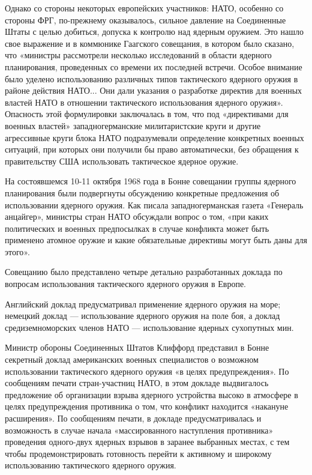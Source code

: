 \documentclass[12pt, a4paper, openany]{book}
\begin{document}
	Однако со стороны некоторых европейских участников: НАТО, особенно со стороны ФРГ, по-прежнему оказывалось, сильное давление на Соединенные Штаты с целью добиться, допуска к контролю над ядерным оружием. Это нашло свое выражение и в коммюнике Гаагского совещания, в котором было сказано, что «министры рассмотрели несколько исследований в области ядерного планирования, проведенных со времени их последней встречи. Особое внимание было уделено использованию различных типов тактического ядерного оружия в районе действия НАТО... Они дали указания о разработке директив для военных властей НАТО в отношении тактического использования ядерного оружия». Опасность этой формулировки заключалась в том, что под «директивами для военных властей» западногерманские милитаристские круги и другие агрессивные круги блока НАТО подразумевали определение конкретных военных ситуаций, при которых они получили бы право автоматически, без обращения к правительству США использовать тактическое ядерное оружие.
	
	На состоявшемся 10-11 октября 1968 года в Бонне совещании группы ядерного планирования были подвергнуты обсуждению конкретные предложения об использовании ядерного оружия. Как писала западногерманская газета «Генераль анцайгер», министры стран НАТО обсуждали вопрос о том, «при каких политических и военных предпосылках в случае конфликта может быть применено атомное оружие и какие обязательные директивы могут быть даны для этого».
	
	Совещанию было представлено четыре детально разработанных доклада по вопросам использования тактического ядерного оружия в Европе.
	
	Английский доклад предусматривал применение ядерного оружия на море; немецкий доклад — использование ядерного оружия на поле боя, а доклад средиземноморских членов НАТО — использование ядерных сухопутных мин.
	
	Министр обороны Соединенных Штатов Клиффорд представил в Бонне секретный доклад американских военных специалистов о возможном использовании тактического ядерного оружия «в целях предупреждения». По сообщениям печати стран-участниц НАТО, в этом докладе выдвигалось предложение об организации взрыва ядерного устройства высоко в атмосфере в целях предупреждения противника о том, что конфликт находится «накануне расширения». По сообщениям печати, в докладе предусматривалась и возможность в случае начала «массированного наступления противника» проведения одного-двух ядерных взрывов в заранее выбранных местах, с тем чтобы продемонстрировать готовность перейти к активному и широкому использованию тактического ядерного оружия.
	
\end{document}
